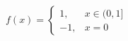 \documentclass[preview]{standalone}
\begin{document}
\begin{align*}
f(x) = \begin{cases} 1, & x \in (0, 1] \\ -1, & x = 0 \end{cases}
\end{align*}
\end{document}
